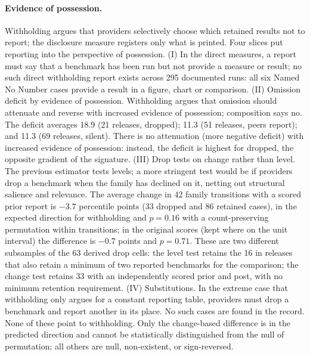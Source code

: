 \paragraph{Evidence of possession.}
Withholding argues that providers selectively choose which retained results not to report; the disclosure measure registers only what is printed. Four slices put reporting into the perspective of possession. (I) In the direct measures, a report must say that a benchmark has been run but not provide a measure or result; no such direct withholding report exists across 295 documented runs: all six Named No Number cases provide a result in a figure, chart or comparison. (II) Omission deficit by evidence of possession. Withholding argues that omission should attenuate and reverse with increased evidence of possession; composition says no. The deficit averages 18.9 (21 releases, dropped); 11.3 (51 releases, peers report); and 11.3 (69 releases, silent). There is no attenuation (more negative deficit) with increased evidence of possession: instead, the deficit is highest for dropped, the opposite gradient of the signature. (III) Drop tests on change rather than level. The previous estimator tests levels; a more stringent test would be if providers drop a benchmark when the family has declined on it, netting out structural salience and relevance. The average change in 42 family transitions with a scored prior report is $-3.7$ percentile points (33 dropped and 86 retained cases), in the expected direction for withholding and $p = 0.16$ with a count-preserving permutation within transitions; in the original scores (kept where on the unit interval) the difference is $-0.7$ points and $p = 0.71$. These are two different subsamples of the 63 derived drop cells: the level test retains the 16 in releases that also retain a minimum of two reported benchmarks for the comparison; the change test retains 33 with an independently scored prior and post, with no minimum retention requirement. (IV) Substitutions. In the extreme case that withholding only argues for a constant reporting table, providers must drop a benchmark and report another in its place. No such cases are found in the record. None of these point to withholding. Only the change-based difference is in the predicted direction and cannot be statistically distinguished from the null of permutation; all others are null, non-existent, or sign-reversed.

